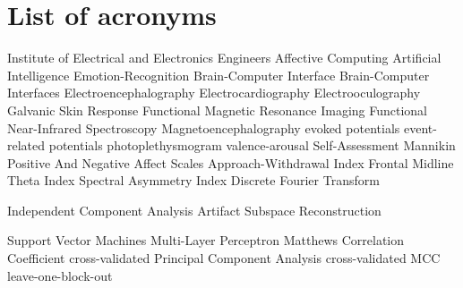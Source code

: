 \chapter{List of acronyms}

\begin{acronym}[TDMAAA]
					{Institute of Electrical and Electronics Engineers}
					{Affective Computing}	
					{Artificial Intelligence}
    			   {Emotion-Recognition}
    			   {Brain-Computer Interface}
    			   {Brain-Computer Interfaces}
    			   {Electroencephalography}
    				{Electrocardiography}
    	 	{Electrooculography}
    		{Galvanic Skin Response}
               {Functional Magnetic Resonance Imaging}
              {Functional Near-Infrared Spectroscopy}
               {Magnetoencephalography}
               {evoked potentials}
    		  {event-related potentials}
            {photoplethysmogram}
            {valence-arousal}
    		{Self-Assessment Mannikin}
    		{Positive And Negative Affect Scales}
    		{Approach-Withdrawal Index}
    		{Frontal Midline Theta Index}
    		{Spectral Asymmetry Index}
    		{Discrete Fourier Transform}
    
    
    		{Independent Component Analysis}
    		{Artifact Subspace Reconstruction}
    
    		{Support Vector Machines}
    		{Multi-Layer Perceptron}
    		{Matthews Correlation Coefficient}
			{cross-validated}
    		{Principal Component Analysis}
    		{cross-validated MCC}
    		{leave-one-block-out}
\end{acronym}

